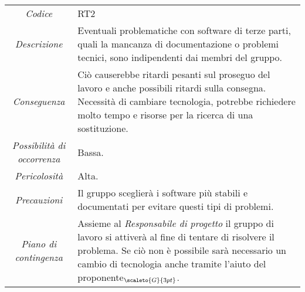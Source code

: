 {{	\begin{center}
		\renewcommand{\arraystretch}{1.4}
		\begin{tabularx}{\textwidth}{|c|X|}
			\hline
			\rowcolor{airforceblue}
			\multicolumn{2}{|c|}{\textit{Software terze parti}}\\
			\hline
			\textit{Codice} & RT2 \\
			\hline
			\textit{Descrizione} & Eventuali problematiche con software di terze parti, quali la mancanza di documentazione o problemi tecnici, sono indipendenti dai membri del gruppo. \\
			\hline
			\textit{Conseguenza} & Ciò causerebbe ritardi pesanti sul proseguo del lavoro e anche possibili ritardi sulla consegna.
			Necessità di cambiare tecnologia, potrebbe richiedere molto tempo e risorse per la ricerca di una sostituzione. \\
			\hline
			\textit{Possibilità di occorrenza} & Bassa. \\
			\hline
			\textit{Pericolosità} & Alta. \\
			\hline
			\textit{Precauzioni} & Il gruppo sceglierà i software più stabili e documentati per evitare questi tipi di problemi.  \\
			\hline
			\textit{Piano di contingenza} & Assieme al \textit{Responsabile di progetto} il gruppo di lavoro si attiverà al fine di tentare di risolvere il problema. Se ciò non è possibile sarà necessario un cambio di tecnologia anche tramite l'aiuto del proponente$_{\scaleto{G}{3pt}}$.  \\
			\hline
		\end{tabularx}
	\end{center}


\def\tabularxcolumn#1{m{#1}}
{

}}}
